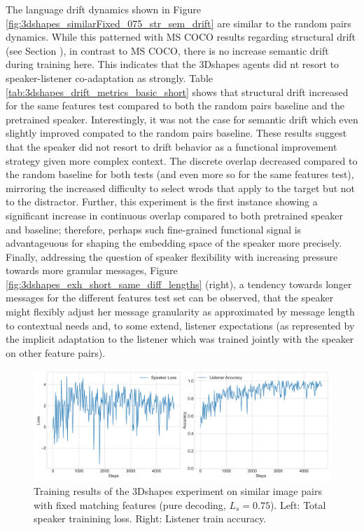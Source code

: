 The language drift dynamics shown in Figure \ref{fig:3dshapes_similarFixed_075_str_sem_drift} are similar to the random pairs dynamics. While this patterned with MS COCO results regarding structural drift (see Section ), in contrast to MS COCO, there is no increase semantic drift during training here. This indicates that the 3Dshapes agents did nt resort to speaker-listener co-adaptation as strongly. 
Table \ref{tab:3dshapes_drift_metrics_basic_short} shows that structural drift increased for the same features test compared to both the random pairs baseline and the pretrained speaker. Interestingly, it was not the case for semantic drift which even slightly improved compated to the random pairs baseline. These results suggest that the speaker did not resort to drift behavior as a functional improvement strategy given more complex context. The discrete overlap decreased compared to the random baseline for both tests (and even more so for the same features test), mirroring the increased difficulty to select wrods that apply to the target but not to the distractor. Further, this experiment is the first instance showing a significant increase in continuous overlap compared to both pretrained speaker and baseline; therefore, perhaps such fine-grained functional signal is advantageuous for shaping the embedding space of the speaker more precisely. Finally, addressing the question of speaker flexibility with increasing pressure towards more granular messages, Figure \ref{fig:3dshapes_exh_short_same_diff_lengths} (right), a tendency towards longer messages for the different features test set can be observed, that the speaker might flexibly adjust her message granularity as approximated by message length to contextual needs and, to some extend, listener expectations (as represented by the implicit adaptation to the listener which was trained jointly with the speaker on other feature pairs). 

\begin{figure}[h]
	\centering
	\includegraphics[width=\linewidth]{images/3dshapes_baseline_similarFixed_075_losses.png}
	\caption{Training results of the 3Dshapes experiment on similar image pairs with fixed matching features (pure decoding, $L_s = 0.75$). Left: Total speaker trainining loss. Right: Listener train accuracy.}
	\label{fig:3dshapes_similarFixed_075_speaker_loss_listener_acc}
\end{figure}


